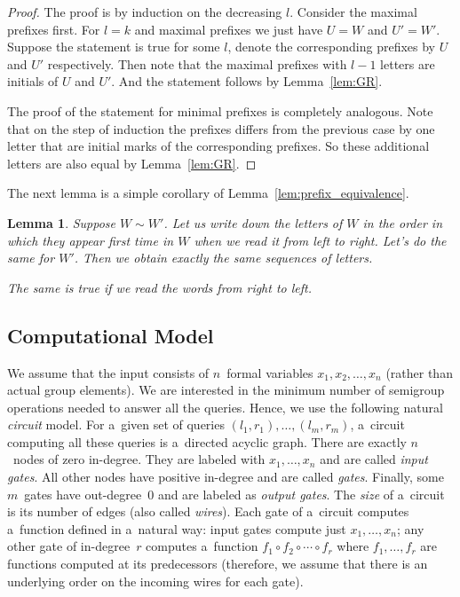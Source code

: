 \documentclass[11pt,letterpaper]{article}
\newtheorem{lemma}{Lemma}
\begin{document}
\begin{proof}
The proof is by induction on the decreasing $l$. Consider the maximal prefixes first. For $l=k$ and maximal prefixes we just have $U= W$ and $U'=W'$. Suppose the statement is true for some $l$, denote the corresponding prefixes by $U$ and $U'$ respectively. Then note that the maximal prefixes with $l-1$ letters are initials of $U$ and $U'$. And the statement follows by Lemma~\ref{lem:GR}.

The proof of the statement for minimal prefixes is completely analogous. Note that on the step of induction the prefixes differs from the previous case by one letter that are  initial marks of the corresponding prefixes. So these additional letters are also equal by Lemma~\ref{lem:GR}.
\end{proof}

The next lemma is a simple corollary of Lemma~\ref{lem:prefix_equivalence}.
\begin{lemma} \label{lem:variables_order}
Suppose $W \sim W'$. Let us write down the letters of $W$ in the order in which they appear first time in $W$ when we read it from left to right. Let's do the same for $W'$. Then we obtain exactly the same sequences of letters.

The same is true if we read the words from right to left.
\end{lemma}


\subsection{Computational Model}
We assume that the input consists of $n$~formal variables $x_1, x_2, \dotsc, x_n$ (rather than actual group elements). We are interested in the minimum number of semigroup operations needed to answer all the queries. Hence, we use the following natural {\em circuit} model. For a~given set of queries $(l_1,r_1), \dotsc, (l_m,r_m)$, a~circuit computing all these queries is a~directed acyclic graph. There are exactly $n$~nodes of zero in-degree. They are labeled with $x_1, \dotsc, x_n$ and are called {\em input gates}. All other nodes have positive in-degree and are called {\em gates}. Finally, some $m$~gates have out-degree~0 and are labeled as {\em output gates}. The {\em size} of a~circuit is its number of edges (also called {\em wires}). Each gate of a~circuit computes a~function defined in a~natural way: input gates compute just $x_1, \dotsc, x_n$; any other gate of in-degree~$r$ computes a~function $f_1 \circ f_2 \circ \dotsb \circ f_r$ where $f_1, \dotsc, f_r$ are functions computed at its predecessors (therefore, we assume that there is an underlying order on the incoming wires for each gate).
\end{document}
